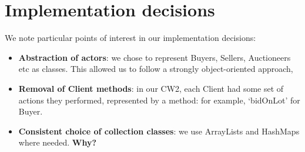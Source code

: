 \documentclass[titlepage, 12pt]{extarticle}
\begin{document}
\section{Implementation decisions}
We note particular points of interest in our implementation decisions:
\begin{itemize}
\item {\bf Abstraction of actors}: we chose to represent Buyers, Sellers, Auctioneers etc as classes. This allowed us to follow a strongly object-oriented approach, 
\item {\bf Removal of Client methods}: in our CW2, each Client had some set of actions they performed, represented by a method: for example, `bidOnLot' for Buyer. 
\item {\bf Consistent choice of collection classes}: we use ArrayLists and HashMaps where needed. {\bf Why?}
\end{itemize}


\end{document}
